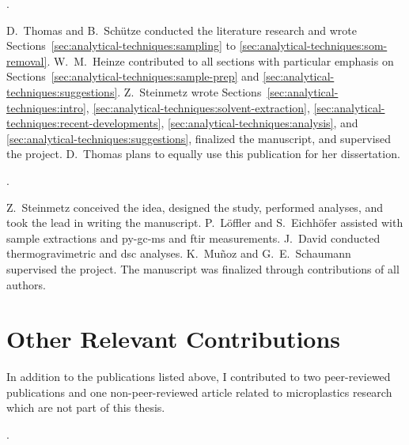 \vspace{0.5\baselineskip}
\noindent{}.

\begin{description}
	\setlength\itemsep{0em}
	\item[Author contributions:] D.~Thomas and B.~Schütze conducted the literature research and wrote Sections~\ref{sec:analytical-techniques:sampling} to \ref{sec:analytical-techniques:som-removal}. W.~M.~Heinze contributed to all sections with particular emphasis on Sections~\ref{sec:analytical-techniques:sample-prep} and \ref{sec:analytical-techniques:suggestions}. Z.~Steinmetz wrote Sections~\ref{sec:analytical-techniques:intro}, \ref{sec:analytical-techniques:solvent-extraction}, \ref{sec:analytical-techniques:recent-developments}, \ref{sec:analytical-techniques:analysis}, and \ref{sec:analytical-techniques:suggestions}, finalized the manuscript, and supervised the project. D.~Thomas plans to equally use this publication for her dissertation.
\end{description}

\vspace{0.5\baselineskip}
\noindent{}.

\begin{description}
	\setlength\itemsep{0em}
	\item[Author contributions:] Z.~Steinmetz conceived the idea, designed the study, performed analyses, and took the lead in writing the manuscript. P.~Löffler and S.~Eichhöfer assisted with sample extractions and \ac{py-gc-ms} and \ac{ftir} measurements. J.~David conducted thermogravimetric and \ac{dsc} analyses. K.~Muñoz and G.~E.~Schaumann supervised the project. The manuscript was finalized through contributions of all authors.
\end{description}

\section*{Other Relevant Contributions}

In addition to the publications listed above, I contributed to two peer-reviewed publications and one non-peer-reviewed article related to microplastics research which are not part of this thesis.

\vspace{0.5\baselineskip}
\noindent{}.

